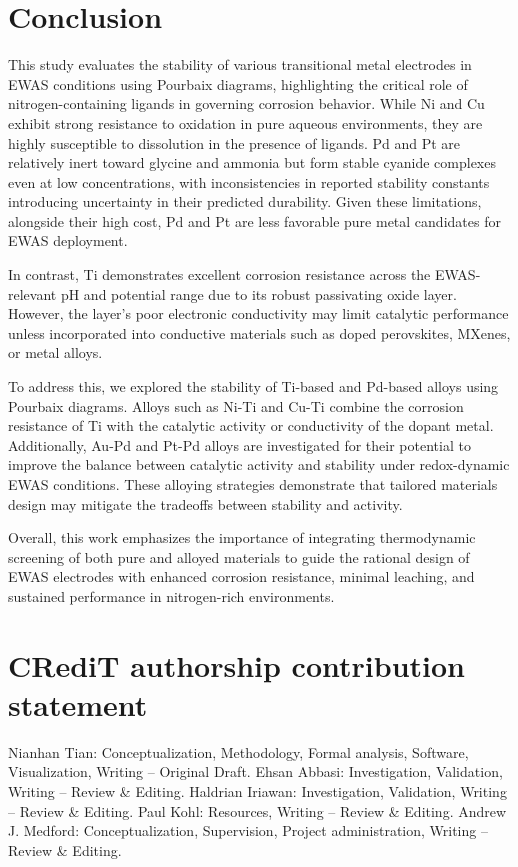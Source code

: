 \documentclass[journal=jacsat,manuscript=article]{achemso}
\begin{document}
\section{Conclusion}

This study evaluates the stability of various transitional metal electrodes in EWAS conditions using Pourbaix diagrams, highlighting the critical role of nitrogen-containing ligands in governing corrosion behavior. While Ni and Cu exhibit strong resistance to oxidation in pure aqueous environments, they are highly susceptible to dissolution in the presence of  ligands. Pd and Pt are relatively inert toward glycine and ammonia but form stable cyanide complexes even at low concentrations, with inconsistencies in reported stability constants introducing uncertainty in their predicted durability. Given these limitations, alongside their high cost, Pd and Pt are less favorable pure metal candidates for EWAS deployment.

In contrast, Ti demonstrates excellent corrosion resistance across the EWAS-relevant pH and potential range due to its robust passivating oxide layer. However, the  layer's poor electronic conductivity may limit catalytic performance unless incorporated into conductive materials such as doped perovskites, MXenes, or metal alloys.

To address this, we explored the stability of Ti-based and Pd-based alloys using Pourbaix diagrams. Alloys such as Ni-Ti and Cu-Ti combine the corrosion resistance of Ti with the catalytic activity or conductivity of the dopant metal. Additionally, Au-Pd and Pt-Pd alloys are investigated for their potential to improve the balance between catalytic activity and stability under redox-dynamic EWAS conditions. These alloying strategies demonstrate that tailored materials design may mitigate the tradeoffs between stability and activity.

Overall, this work emphasizes the importance of integrating thermodynamic screening of both pure and alloyed materials to guide the rational design of EWAS electrodes with enhanced corrosion resistance, minimal leaching, and sustained performance in nitrogen-rich environments.


\section{CRediT authorship contribution statement}
Nianhan Tian: Conceptualization, Methodology, Formal analysis, Software, Visualization, Writing – Original Draft.  
Ehsan Abbasi: Investigation, Validation, Writing – Review \& Editing.  
Haldrian Iriawan: Investigation, Validation, Writing – Review \& Editing.  
Paul Kohl: Resources, Writing – Review \& Editing.  
Andrew J. Medford: Conceptualization, Supervision, Project administration, Writing – Review \& Editing.
\end{document}
